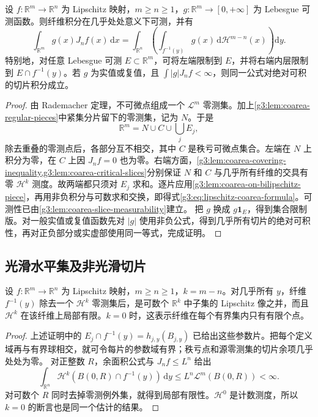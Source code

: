 \begin{theorem}[余面积公式]\label{g3:thm:lipschitz-coarea-formula}
	设 \(f:\mathbb R^m\to\mathbb R^n\) 为 Lipschitz 映射，\(m\ge n\ge1\)，\(g:\mathbb R^m\to[0,+\infty]\) 为 Lebesgue 可测函数。则纤维积分在几乎处处意义下可测，并有
	\begin{equation}\label{g3:eq:lipschitz-coarea-formula}
		\int_{\mathbb R^m}g(x)J_nf(x)\,\mathrm dx
		=\int_{\mathbb R^n}\left(\int_{f^{-1}(y)}g(x)\,\mathrm d\mathcal H^{m-n}(x)\right)\mathrm dy.
	\end{equation}
	特别地，对任意 Lebesgue 可测 \(E\subset\mathbb R^m\)，可将左端限制到 \(E\)，并将右端内层限制到 \(E\cap f^{-1}(y)\)。若 \(g\) 为实值或复值，且 \(\int|g|J_nf<\infty\)，则同一公式对绝对可积的切片积分成立。
\end{theorem}
\begin{proof}
	由 Rademacher 定理，不可微点组成一个 \(\mathcal L^m\) 零测集。加上\cref{g3:lem:coarea-regular-pieces}中紧集分片留下的零测集，记为 \(N\)。于是
	\[
		\mathbb R^m=N\cup C\cup\bigcup_jE_j,
	\]
	除去重叠的零测点后，各部分互不相交，其中 \(C\) 是秩亏可微点集合。左端在 \(N\) 上积分为零，在 \(C\) 上因 \(J_nf=0\) 也为零。右端方面，\cref{g3:lem:coarea-covering-inequality,g3:lem:coarea-critical-slices}分别保证 \(N\) 和 \(C\) 与几乎所有纤维的交具有零 \(\mathcal H^k\) 测度。故两端都只须对 \(E_j\) 求和。逐片应用\cref{g3:lem:coarea-on-bilipschitz-piece}，再用非负积分与可数求和交换，即得式\eqref{g3:eq:lipschitz-coarea-formula}。可测性已由\cref{g3:lem:coarea-slice-measurability}建立。
	把 \(g\) 换成 \(g\mathbf1_E\)，得到集合限制版。对一般实值或复值函数先对 \(|g|\) 使用非负公式，得到几乎所有切片的绝对可积性，再对正负部分或实虚部使用同一等式，完成证明。
\end{proof}

\subsection{光滑水平集及非光滑切片}
\label{g3:subsec:2004:04}
\begin{corollary}\label{g3:cor:coarea-almost-every-slice}
	设 \(f:\mathbb R^m\to\mathbb R^n\) 为 Lipschitz 映射，\(m\ge n\ge1\)，\(k=m-n\)。对几乎所有 \(y\)，纤维 \(f^{-1}(y)\) 除去一个 \(\mathcal H^k\) 零测集后，是可数个 \(\mathbb R^k\) 中子集的 Lipschitz 像之并，而且 \(\mathcal H^k\) 在该纤维上局部有限。\(k=0\) 时，这表示纤维在每个有界集内只有有限个点。
\end{corollary}
\begin{proof}
	上述证明中的 \(E_j\cap f^{-1}(y)=h_{j,y}(B_{j,y})\) 已给出这些参数片。把每个定义域再与有界球相交，就可令每片的参数域有界；秩亏点和源零测集的切片余项几乎处处为零。
	对正整数 \(R\)，余面积公式与 \(J_nf\le L^n\) 给出
	\[
		\int_{\mathbb R^n}\mathcal H^k(B(0,R)\cap f^{-1}(y))\,\mathrm dy
		\le L^n\mathcal L^m(B(0,R))<\infty.
	\]
	对可数个 \(R\) 同时去掉零测例外集，就得到局部有限性。\(\mathcal H^0\) 是计数测度，所以 \(k=0\) 的断言也是同一个估计的结果。
\end{proof}

